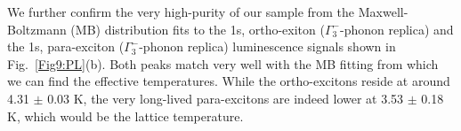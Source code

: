 \documentclass[aps,reprint,amsmath,amssymb,prb]{revtex4-1}
\begin{document}
We further confirm the very high-purity of our sample from the Maxwell-Boltzmann (MB) distribution fits to the 1s, ortho-exiton ($\Gamma_{3}^{-}$-phonon replica) and the 1s, para-exciton ($\Gamma_{3}^{-}$-phonon replica) luminescence signals shown in Fig.~\ref{Fig9:PL}(b). Both peaks match very well with the MB fitting from which we can find the effective temperatures. While the ortho-excitons reside at around 4.31 $\pm$ 0.03 K, the very long-lived para-excitons are indeed lower at 3.53 $\pm$ 0.18 K, which would be the lattice temperature.

\clearpage
\end{document}
